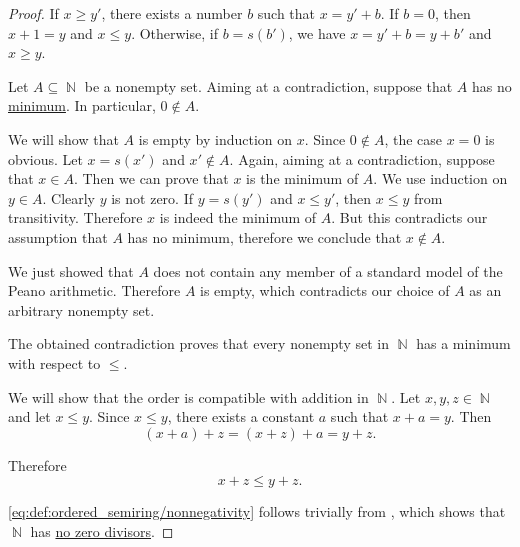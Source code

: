 \begin{proof}
  If \( x \geq y' \), there exists a number \( b \) such that \( x = y' + b \). If \( b = 0 \), then \( x + 1 = y \) and \( x \leq y \). Otherwise, if \( b = s(b') \), we have \( x = y' + b = y + b' \) and \( x \geq y \).

   Let \( A \subseteq \BbbN \) be a nonempty set. Aiming at a contradiction, suppose that \( A \) has no \hyperref[def:poset_extremal_points/maximum_and_minimum]{minimum}. In particular, \( 0 \not\in A \).

  We will show that \( A \) is empty by induction on \( x \). Since \( 0 \not\in A \), the case \( x = 0 \) is obvious. Let \( x = s(x') \) and \( x' \not\in A \). Again, aiming at a contradiction, suppose that \( x \in A \). Then we can prove that \( x \) is the minimum of \( A \). We use induction on \( y \in A \). Clearly \( y \) is not zero. If \( y = s(y') \) and \( x \leq y' \), then \( x \leq y \) from transitivity. Therefore \( x \) is indeed the minimum of \( A \). But this contradicts our assumption that \( A \) has no minimum, therefore we conclude that \( x \not\in A \).

  We just showed that \( A \) does not contain any member of a standard model of the Peano arithmetic. Therefore \( A \) is empty, which contradicts our choice of \( A \) as an arbitrary nonempty set.

  The obtained contradiction proves that every nonempty set in \( \BbbN \) has a minimum with respect to \( \leq \).

   We will show that the order is compatible with addition in \( \BbbN \). Let \( x, y, z \in \BbbN \) and let \( x \leq y \). Since \( x \leq y \), there exists a constant \( a \) such that \( x + a = y \). Then
  \begin{equation*}
    (x + a) + z = (x + z) + a = y + z.
  \end{equation*}

  Therefore
  \begin{equation*}
    x + z \leq y + z.
  \end{equation*}

   \eqref{eq:def:ordered_semiring/nonnegativity} follows trivially from , which shows that \( \BbbN \) has \hyperref[def:semiring/no_zero_divisor]{no zero divisors}.
\end{proof}
